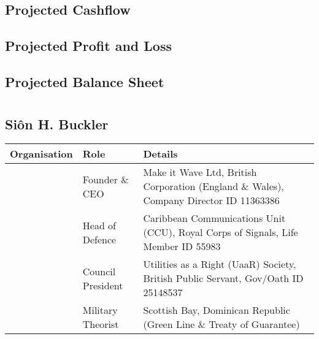 \documentclass[letterpaper,10pt,openany,oneside,english]{sphinxmanual}
\begin{document}
\section{Projected Cashflow}
\label{\detokenize{reports:projected-cashflow}}

\section{Projected Profit and Loss}
\label{\detokenize{reports:projected-profit-and-loss}}

\section{Projected Balance Sheet}
\label{\detokenize{reports:projected-balance-sheet}}

\chapter{}
\label{\detokenize{index:document-author-s}}

\section{Siôn H. Buckler}
\label{\detokenize{index:sion-h-buckler}}

\begin{savenotes}\sphinxattablestart
\centering
\begin{tabulary}{\linewidth}[t]{|T|T|T|}
\hline
\sphinxstyletheadfamily 
Organisation
&\sphinxstyletheadfamily 
Role
&\sphinxstyletheadfamily 
Details
\\
\hline
\noindent{}
&
Founder \& CEO
&
Make it Wave Ltd, British Corporation (England \& Wales), Company Director ID 11363386
\\
\hline
\noindent{}
&
Head of Defence
&
Caribbean Communications Unit (CCU), Royal Corps of Signals, Life Member ID 55983
\\
\hline
\noindent{}
&
Council President
&
Utilities as a Right (UaaR) Society, British Public Servant, Gov/Oath ID 25148537
\\
\hline
\noindent{}
&
Military Theorist
&
Scottish Bay, Dominican Republic (Green Line \& Treaty of Guarantee)
\\
\hline
\end{tabulary}
\par
\sphinxattableend\end{savenotes}
\end{document}
